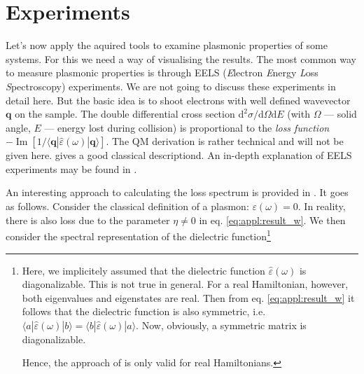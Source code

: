 \documentclass[a4paper,12pt]{article}
\begin{document}
\newpage
\section{Experiments}
    Let's now apply the aquired tools to examine plasmonic properties of some systems. For this we need a way of visualising the results. The most common way to measure plasmonic properties is through EELS (\textit{E}lectron \textit{E}nergy \textit{L}oss \textit{S}pectroscopy) experiments. We are not going to discuss these experiments in detail here. But the basic idea is to shoot electrons with well defined wavevector $\mathbf{q}$ on the sample. The double differential cross section $\text{d}^2\sigma/\text{d}\Omega\text{d}E$ (with $\Omega$ --- solid angle, $E$ --- energy lost during collision) is proportional to the \textit{loss function} \ $-\operatorname{Im}[1 / \langle\mathbf{q}| \hat\varepsilon(\omega) |\mathbf{q}\rangle]$. The QM derivation is rather technical and will not be given here. \cite{jackson1925classical} gives a good classical descriptiond. An in-depth explanation of EELS experiments may be found in \cite{egerton2009eels}.
    
    An interesting approach to calculating the loss spectrum is provided in \cite{plasmonic2015}. It goes as follows. Consider the classical definition of a plasmon: $\varepsilon(\omega) = 0$. In reality, there is also loss due to the parameter $\eta \neq 0$ in eq. \eqref{eq:appl:result_w}. We then consider the spectral representation of the dielectric function\footnote{ %
    Here, we implicitely assumed that the dielectric function $\hat\varepsilon(\omega)$ is diagonalizable. This is not true in general. For a real Hamiltonian, however, both eigenvalues and eigenstates are real. Then from eq. \eqref{eq:appl:result_w} it follows that the dielectric function is also symmetric, i.e. $\langle a|\hat\varepsilon(\omega)|b \rangle = \langle b|\hat\varepsilon(\omega)|a \rangle$. Now, obviously, a symmetric matrix is diagonalizable.
    
    Hence, the approach of \cite{plasmonic2015} is only valid for real Hamiltonians. }

\end{document}
